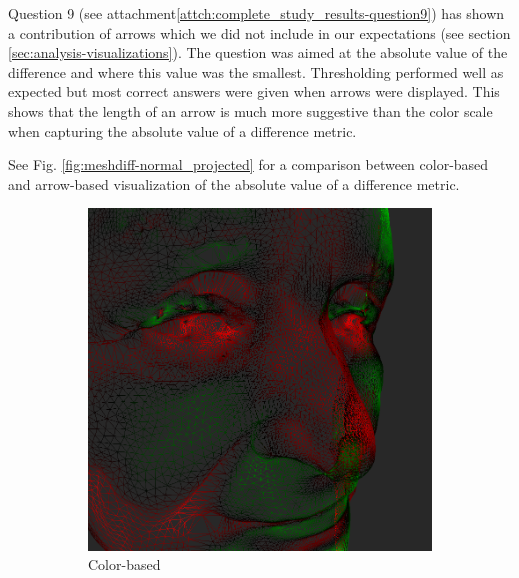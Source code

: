 Question 9 (see attachment\ref{attch:complete_study_results-question9}) has shown a contribution of arrows which we did not include in our expectations (see section \ref{sec:analysis-visualizations}). The question was aimed at the absolute value of the difference and where this value was the smallest. Thresholding performed well as expected but most correct answers were given when arrows were displayed. This shows that the length of an arrow is much more suggestive than the color scale when capturing the absolute value of a difference metric.

See Fig. \ref{fig:meshdiff-normal_projected} for a comparison between color-based and arrow-based visualization of the absolute value of a difference metric.

\begin{figure}[h]
	\centering
	\begin{subfigure}{0.4\textwidth}
		\includegraphics[width=\textwidth]{./img/normal_projected_vis-color.PNG}
		\caption{Color-based}
	\end{subfigure}
	\qquad
	\begin{subfigure}{0.4\textwidth}

\end{subfigure}
\end{figure}
